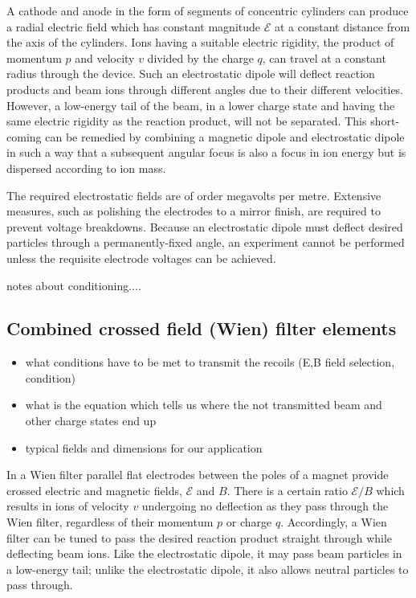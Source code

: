 A cathode and anode in the form of segments of concentric cylinders can produce a radial electric field which has constant magnitude $\mathcal{E}$  at a constant distance from the axis of the cylinders.   Ions having a suitable electric rigidity, the product of momentum $p$ and velocity $v$ divided by the charge $q$, can travel at a constant radius through the device.   Such an electrostatic dipole will deflect reaction products and beam ions through different angles due to their different velocities.  However, a low-energy tail of the beam, in a lower charge state and having the same electric rigidity as the reaction product, will not be separated.   This short-coming can be remedied by combining a magnetic dipole and electrostatic dipole in such a way that a subsequent angular focus is also a focus in ion energy but is dispersed according to ion mass.  

The required electrostatic fields are of order megavolts per metre.   Extensive measures, such as polishing the electrodes to a mirror finish, are required to prevent voltage breakdowns.   Because an electrostatic dipole must deflect desired particles through a permanently-fixed angle,  an experiment  cannot be performed unless the requisite   electrode voltages can be achieved.

notes about conditioning....

\subsection{Combined crossed field (Wien) filter elements}

\small
\begin{itemize}
\item what conditions have to be met to transmit the recoils (E,B field selection, condition)
\item what is the equation which tells us where the not transmitted beam and other charge states end up
\item typical fields and dimensions for our application
\end{itemize}
\normalsize

In a Wien filter parallel flat electrodes between the poles of a magnet provide crossed electric and magnetic fields, $\mathcal{E}$ and $B$.      There is a certain ratio $\mathcal{E}/B$ which results in ions of velocity $v$  undergoing no deflection as they pass through the Wien filter, regardless of their momentum $p$ or charge $q$.    Accordingly, a Wien filter can be tuned to pass the desired reaction product straight through while deflecting beam ions.  Like the electrostatic dipole, it may pass beam particles in  a low-energy tail; unlike the electrostatic dipole, it  also allows   neutral particles to pass through.

